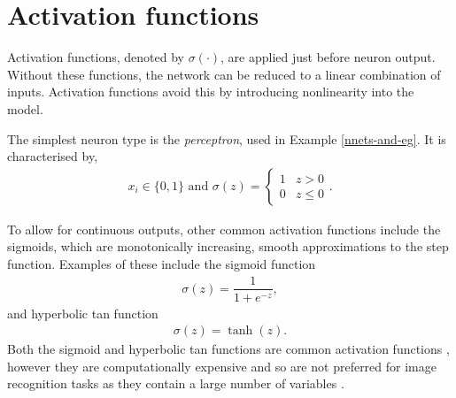 
\pagebreak
\section{Activation functions}\label{nnets-act}

Activation functions, denoted by $\sigma(\cdot)$, are applied just before neuron output. Without these functions, the network can be reduced to a linear combination of inputs. Activation functions avoid this by introducing nonlinearity into the model.

The simplest neuron type is the \textit{perceptron}, used in Example \ref{nnets-and-eg}. It is characterised by,
\begin{align}
	x_i \in \{0,1\} \text{ and } \sigma(z) = \begin{cases}
		1 & z > 0 \\
		0 & z \le 0
	\end{cases}.
\end{align}

To allow for continuous outputs, other common activation functions include the sigmoids, which are monotonically increasing, smooth approximations to the step function. Examples of these include the sigmoid function
\begin{align}
	\sigma(z) = \dfrac{1}{1+e^{-z}},
\end{align}
and hyperbolic tan function
\begin{align}
	\sigma(z) = \tanh(z).
\end{align}
Both the sigmoid and hyperbolic tan functions are common activation functions \cite{Goodfellow-et-al-2016}, however they are computationally expensive and so are not preferred for image recognition tasks as they contain a large number of variables \cite{LeCun2012, Nielson2015}.

